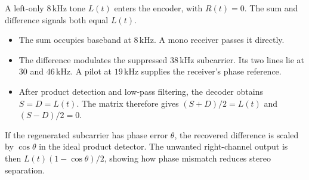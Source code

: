 \documentclass[12pt,a4paper]{article}
\begin{document}
\begin{tcolorbox}[tikzbox, unbreakable, title={FM Stereo Encoder and Decoder}]
\centering
{}\par
\end{tcolorbox}

\begin{tcolorbox}[examplebox, title={Trace and Recover the FM Stereo Channels}]
A left-only $8\,\mathrm{kHz}$ tone $L(t)$ enters the encoder, with $R(t)=0$. The sum and difference signals both equal $L(t)$.
\begin{itemize}[leftmargin=*, itemsep=3pt]
 \item The sum occupies baseband at $8\,\mathrm{kHz}$. A mono receiver passes it directly.
 \item The difference modulates the suppressed $38\,\mathrm{kHz}$ subcarrier. Its two lines lie at $30$ and $46\,\mathrm{kHz}$. A pilot at $19\,\mathrm{kHz}$ supplies the receiver's phase reference.
 \item After product detection and low-pass filtering, the decoder obtains $S=D=L(t)$. The matrix therefore gives $(S+D)/2=L(t)$ and $(S-D)/2=0$.
\end{itemize}
If the regenerated subcarrier has phase error $\theta$, the recovered difference is scaled by $\cos\theta$ in the ideal product detector. The unwanted right-channel output is then $L(t)(1-\cos\theta)/2$, showing how phase mismatch reduces stereo separation.
\end{tcolorbox}
\end{document}
